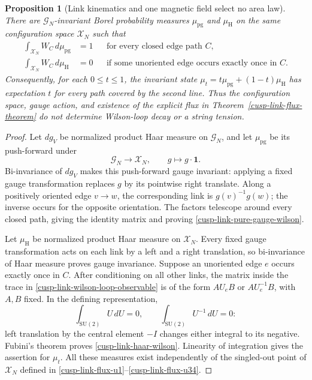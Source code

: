 \documentclass[11pt]{article}
\newtheorem{proposition}[theorem]{Proposition}
\theoremstyle{definition}
\numberwithin{equation}{section}
\begin{document}
\begin{proposition}[Link kinematics and one magnetic field select no area law]
\label{cusp-link-no-area-law-from-kinematics}
There are \(\mathscr G_N\)-invariant Borel probability measures
\(\mu_{\mathrm{pg}}\) and \(\mu_{\mathrm H}\) on the same configuration
space \(\mathscr X_N\) such that
\begin{align}
 \int_{\mathscr X_N}W_C\,d\mu_{\mathrm{pg}}&=1
 &&\text{for every closed edge path }C,
 \label{cusp-link-pure-gauge-wilson}\\
 \int_{\mathscr X_N}W_C\,d\mu_{\mathrm H}&=0
 &&\text{if some unoriented edge occurs exactly once in }C.
 \label{cusp-link-haar-wilson}
\end{align}
Consequently, for each \(0\le t\le1\), the invariant state
\(\mu_t=t\mu_{\mathrm{pg}}+(1-t)\mu_{\mathrm H}\) has expectation \(t\)
for every path covered by the second line.  Thus the configuration space,
gauge action, and existence of the explicit flux in
Theorem~\ref{cusp-link-flux-theorem} do not determine Wilson-loop decay or a
string tension.
\end{proposition}

\begin{proof}
Let \(dg_V\) be normalized product Haar measure on \(\mathscr G_N\), and let
\(\mu_{\mathrm{pg}}\) be its push-forward under
\[
 \mathscr G_N\longrightarrow\mathscr X_N,
 \qquad
 g\longmapsto g\cdot\mathbf1.
\]
Bi-invariance of \(dg_V\) makes this push-forward gauge invariant: applying a
fixed gauge transformation replaces \(g\) by its pointwise right translate.
Along a
positively oriented edge \(v\to w\), the corresponding link is
\(g(v)^{-1}g(w)\); the inverse occurs for the opposite orientation.  The
factors telescope around every closed path, giving the identity matrix and
proving \eqref{cusp-link-pure-gauge-wilson}.

Let \(\mu_{\mathrm H}\) be normalized product Haar measure on
\(\mathscr X_N\).  Every fixed gauge transformation acts on each link by a
left and a right translation, so bi-invariance of Haar measure proves gauge
invariance.  Suppose an unoriented edge \(e\) occurs exactly once in \(C\).
After conditioning on all other links, the matrix inside the trace in
\eqref{cusp-link-wilson-loop-observable} is of the form \(AU_eB\) or
\(AU_e^{-1}B\), with \(A,B\) fixed.  In the defining representation,
\[
 \int_{\mathrm{SU}(2)}U\,dU=0,
 \qquad
 \int_{\mathrm{SU}(2)}U^{-1}\,dU=0:
\]
left translation by the central element \(-I\) changes either integral to its
negative.  Fubini's theorem proves \eqref{cusp-link-haar-wilson}.  Linearity of
integration gives the assertion for \(\mu_t\).  All these measures exist
independently of the singled-out point of \(\mathscr X_N\) defined in
\eqref{cusp-link-flux-u1}--\eqref{cusp-link-flux-u34}.
\end{proof}
\end{document}

